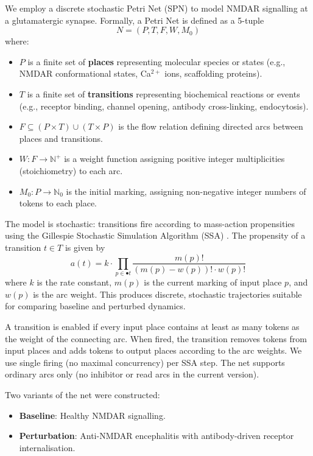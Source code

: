 \documentclass[a4paper,twoside]{article}
\begin{document}
We employ a discrete stochastic Petri Net (SPN) \cite{bause2002stochastic} to model NMDAR signalling at a glutamatergic synapse. Formally, a Petri Net \cite{peterson1977petri} is defined as a 5-tuple 
\[
N = (P, T, F, W, M_0)
\]
where:
\begin{itemize}
    \item $P$ is a finite set of \textbf{places} representing molecular species or states (e.g., NMDAR conformational states, Ca$^{2+}$ ions, scaffolding proteins).
    \item $T$ is a finite set of \textbf{transitions} representing biochemical reactions or events (e.g., receptor binding, channel opening, antibody cross-linking, endocytosis).
    \item $F \subseteq (P \times T) \cup (T \times P)$ is the flow relation defining directed arcs between places and transitions.
    \item $W: F \to \mathbb{N}^+$ is a weight function assigning positive integer multiplicities (stoichiometry) to each arc.
    \item $M_0: P \to \mathbb{N}_0$ is the initial marking, assigning non-negative integer numbers of tokens to each place.
\end{itemize}

The model is stochastic: transitions fire according to mass-action propensities using the Gillespie Stochastic Simulation Algorithm (SSA) \cite{pineda2008SSA}. The propensity of a transition $t \in T$ is given by
\[
a(t) = k \cdot \prod_{p \in \bullet t} \frac{m(p)!}{(m(p) - w(p))! \cdot w(p)!}
\]
where $k$ is the rate constant, $m(p)$ is the current marking of input place $p$, and $w(p)$ is the arc weight. This produces discrete, stochastic trajectories suitable for comparing baseline and perturbed dynamics.

A transition is enabled if every input place contains at least as many tokens as the weight of the connecting arc. When fired, the transition removes tokens from input places and adds tokens to output places according to the arc weights. We use single firing (no maximal concurrency) per SSA step. The net supports ordinary arcs only (no inhibitor or read arcs in the current version).

Two variants of the net were constructed:
\begin{itemize}
    \item \textbf{Baseline}: Healthy NMDAR signalling.
    \item \textbf{Perturbation}: Anti-NMDAR encephalitis with antibody-driven receptor internalisation.
\end{itemize}
\end{document}
